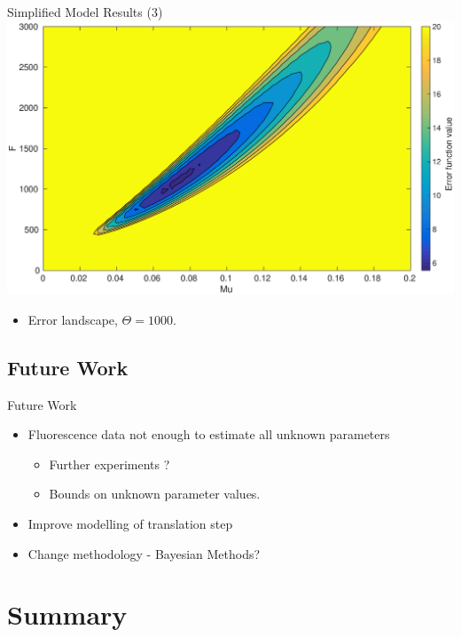 \documentclass{beamer}
\begin{document}
\begin{frame}{Simplified Model Results (3)}
  \includegraphics[scale = 0.25, clip = true, trim = 60 0 0 00]{../Figures/Likelihood_profile_rough}
    \begin{itemize}
\item  Error landscape, $\Theta = 1000$.
\end{itemize}
\end{frame}

\subsection{Future Work}


\begin{frame}{Future Work}

  \begin{itemize}
  \item Fluorescence data \alert {not enough} to estimate all unknown parameters 
  \begin{itemize}
  \item Further experiments ?
  \item Bounds on unknown parameter values.
  \end{itemize} 
  \item Improve modelling of translation step
  \item Change methodology - Bayesian Methods?

  \end{itemize}
  
  \end{frame}
  
  \section*{Summary}
\end{document}
